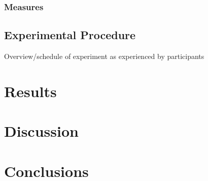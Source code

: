 \documentclass[11pt,a4paper]{report}
\begin{document}
\subsection{Measures}

\section{Experimental Procedure}
Overview/schedule of experiment as experienced by participants

\chapter{Results}

\chapter{Discussion}

\chapter{Conclusions}



\end{document}
